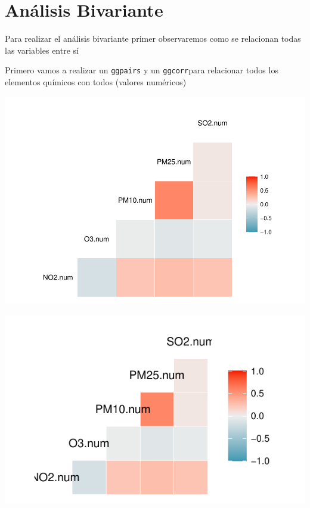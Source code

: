\documentclass[notspecified,article,submit,moreauthors,pdftex]{Definitions/mdpi}
\begin{document}
\hypertarget{anuxe1lisis-bivariante}{%
\section{Análisis Bivariante}\label{anuxe1lisis-bivariante}}

Para realizar el análisis bivariante primer observaremos como se
relacionan todas las variables entre sí

Primero vamos a realizar un \texttt{ggpairs} y un \texttt{ggcorr}para
relacionar todos los elementos químicos con todos (valores numéricos)

\includegraphics{ProyectoAED2023_files/figure-latex/unnamed-chunk-32-1.pdf}

\begin{center}\includegraphics{ProyectoAED2023_files/figure-latex/unnamed-chunk-33-1} \end{center}
\end{document}
